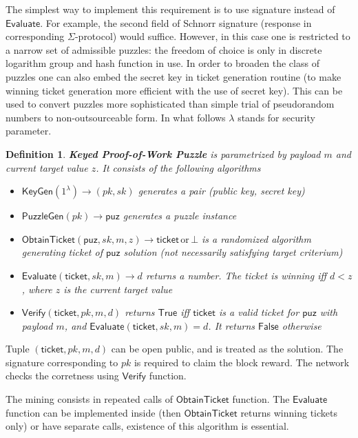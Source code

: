 \documentclass[]{article}
\newcommand{\Ticket}{\mathsf{ticket}}
\newcommand{\KeyGen}{\mathsf{KeyGen}}
\newcommand{\PuzzleGen}{\mathsf{PuzzleGen}}
\newcommand{\Eval}{\mathsf{Evaluate}}
\newcommand{\Verify}{\mathsf{Verify}}
\newcommand{\ObtainTicket}{\mathsf{ObtainTicket}}
\newtheorem{definition}{Definition}
\begin{document}
    The simplest way to implement this requirement is to use signature instead
    of $\Eval$. For example, the second field of Schnorr signature (response in
    corresponding $\Sigma$-protocol) would suffice. However, in this case one is
    restricted to a narrow set of admissible puzzles: the freedom of choice is
    only in discrete logarithm group and hash function in use. In order to
    broaden the class of puzzles one can also embed the secret key in ticket
    generation routine (to make winning ticket generation more efficient with
    the use of secret key). This can be used to convert puzzles more sophisticated
    than simple trial of pseudorandom numbers to non-outsourceable form. In what
    follows $\lambda$ stands for security parameter.
    \begin{definition}
        {\bf Keyed Proof-of-Work Puzzle} is parametrized by payload $m$ and
        current target value $z$. It consists of the following algorithms
        \begin{itemize}
            \item $\KeyGen(1^\lambda)\rightarrow (pk,sk)$ generates a pair (public key,
                secret key)
            \item $\PuzzleGen(pk)\rightarrow \mathsf{puz}$ generates a puzzle instance
            \item
                $\ObtainTicket(\mathsf{puz},sk,m,z)\rightarrow\Ticket \,
                \mathrm{or}\,\bot$
                is a randomized algorithm generating ticket of 
                $\mathsf{puz}$ solution (not necessarily satisfying target
                criterium)
            \item $\Eval(\Ticket,sk,m)\rightarrow d$
                returns a number. The ticket is winning iff $d<z$, where $z$
                is the current target value
            \item $\Verify(\Ticket,pk,m,d)$ returns $\mathsf{True}$ iff
                $\Ticket$ is a valid ticket for $\mathsf{puz}$ with payload $m$,
                and $\Eval(\Ticket,sk,m)=d$. It returns $\mathsf{False}$
                otherwise
        \end{itemize}
    \end{definition}
    Tuple $(\Ticket, pk, m, d)$ can be open public, and is treated as the
    solution. The signature corresponding to $pk$ is required to claim the block
    reward. The network checks the corretness using $\Verify$ function.

    The mining consists in repeated calls of $\ObtainTicket$ function.
    The $\Eval$ function can be implemented inside (then $\ObtainTicket$
    returns winning tickets only) or have separate calls, existence of this
    algorithm is essential.
\end{document}
